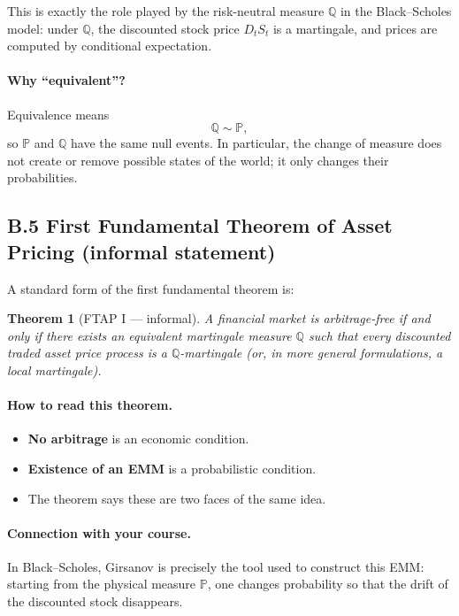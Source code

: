 \documentclass[11pt]{article}
\newcommand{\Pbb}{\mathbb{P}}
\newcommand{\Qbb}{\mathbb{Q}}
\newcommand{\1}{\mathbf{1}}
\newtheorem{theorem}{Theorem}
\begin{document}
This is exactly the role played by the risk-neutral measure \(\Qbb\) in the Black--Scholes model:
under \(\Qbb\), the discounted stock price \(D_tS_t\) is a martingale, and prices are computed by conditional expectation.

\paragraph{Why ``equivalent''?}
Equivalence means
$$
\Qbb \sim \Pbb,
$$
so \(\Pbb\) and \(\Qbb\) have the same null events.
In particular, the change of measure does not create or remove possible states of the world;
it only changes their probabilities.

\subsection*{B.5 First Fundamental Theorem of Asset Pricing (informal statement)}

A standard form of the first fundamental theorem is:

\begin{theorem}[FTAP I --- informal]
A financial market is arbitrage-free if and only if there exists
an equivalent martingale measure \(\Qbb\) such that every discounted traded asset price process is a \(\Qbb\)-martingale
(or, in more general formulations, a local martingale).
\end{theorem}

\paragraph{How to read this theorem.}
\begin{itemize}[leftmargin=1.4em]
    \item \textbf{No arbitrage} is an economic condition.
    \item \textbf{Existence of an EMM} is a probabilistic condition.
    \item The theorem says these are two faces of the same idea.
\end{itemize}

\paragraph{Connection with your course.}
In Black--Scholes, Girsanov is precisely the tool used to construct this EMM:
starting from the physical measure \(\Pbb\), one changes probability so that the drift of the discounted stock disappears.
\end{document}
